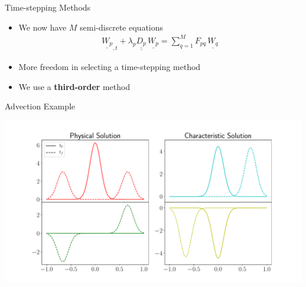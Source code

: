 \documentclass{beamer}
\newcommand{\bunderline}[1]{\underline{#1}}
\renewcommand{\vec}[1]{{\bunderline{#1}}}
\newcommand{\mat}[1]{{\bunderline{\bunderline{#1}}}}
\begin{document}

\begin{frame}{Time-stepping Methods}
    \begin{itemize}
        \item We now have $M$ semi-discrete equations
        \begin{align*}
            \vec{W_{p}}_{, t} + \lambda_{p} \mat{D_{p}} \, \vec{W_{p}} = \sum_{q=1}^{M} F_{pq} \, \vec{W_{q}}
        \end{align*}
        \item More freedom in selecting a time-stepping method
        \item We use a \textbf{third-order} method
    \end{itemize}
\end{frame}

\begin{frame}{Advection Example}
	\begin{minipage}{\linewidth}
		\hspace{-0.13\linewidth}
		\includegraphics[width=1.25\linewidth]{figures/advection.pdf}
	\end{minipage}
\end{frame}
\end{document}

